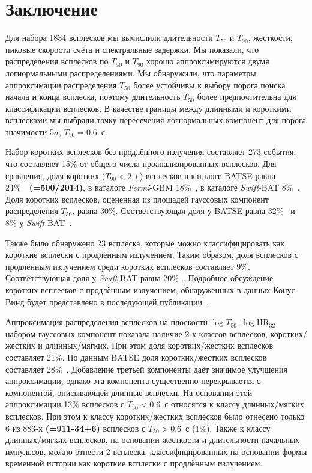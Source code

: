 \section{Заключение} \label{sec:Conclision}
Для набора 1834 всплесков мы вычислили длительности $T_{50}$ и $T_{90}$, жесткости, пиковые скорости счёта и спектральные задержки. Мы показали, что распределения всплесков по $T_{50}$ и $T_{90}$ хорошо аппроксимируются двумя логнормальными распределениями. Мы обнаружили, что параметры аппроксимации распределения $T_{50}$ более устойчивы к выбору порога поиска начала и конца всплеска, поэтому длительность $T_{50}$ более предпочтительна для классификации всплесков. В качестве границы между длинными и короткими всплесками мы выбрали точку пересечения логнормальных компонент для порога значимости 5$\sigma$, $T_{50} = 0.6$~с. 

Набор коротких всплесков без продлённого излучения составляет 273 события, что составляет 15\% от общего числа проанализированных всплесков. Для сравнения, доля коротких ($T_{90}<2$~с) всплесков в каталоге BATSE равна 24\%~\citep{Meegan_2001}~\textbf{(=500/2014)}, в каталоге \textit{Fermi}-GBM 18\%~\citep{Paciesas_2012}, в каталоге \textit{Swift}-BAT 8\%~\citep{Sakamoto_2011_2nd_BAT_catalog}. Доля коротких всплесков, оцененная из площадей гауссовых компонент распределения $T_{50}$, равна 30\%. Соответствующая доля у BATSE равна 32\%~\citep{Horvath_2002} и 8\% у \textit{Swift}-BAT~\citep{Horvath_2008}.  

Также было обнаружено 23 всплеска, которые можно классифицировать как короткие всплески с продлённым излучением. Таким образом, доля всплесков с продлённым излучением среди коротких всплесков составляет 9\%. Соответствующая доля у \textit{Swift}-BAT равна 20\%~\citep{Sakamoto_2011_2nd_BAT_catalog}. Подробное обсуждение коротких всплесков с продлённым излучением, обнаруженных в данных Конус-Винд будет представлено в последующей публикации~\citep{Svinkin_sGRB_EE}.

Аппроксимация распределения всплесков на плоскости $\log T_{50}$--$\log \mbox{HR}_{32}$ набором гауссовых компонент показала наличие 2-х классов всплесков, коротких/жестких и длинных/мягких. При этом доля коротких/жестких всплесков составляет 21\%. По данным BATSE доля коротких/жестких всплесков составляет 28\%~\citep{Horvath_2002}.  Добавление третьей компоненты даёт значимое улучшения аппроксимации, однако эта компонента существенно перекрывается с  компонентой, описывающей длинные всплески. На основании этой аппроксимации 13\% всплесков с $T_{50} < 0.6$~с относятся к классу длинных/мягких всплесков. При этом к классу коротких/жестких всплесков было отнесено только 6 из 883-х \textbf{(=911-34+6)} всплесков с $T_{50} >0.6$~с (1\%). Также к классу длинных/мягких всплесков, на основании жесткости и длительности начальных импульсов, можно отнести 2 всплеска, классифицированных на основании формы временной истории как короткие всплески с продлённым излучением. 

